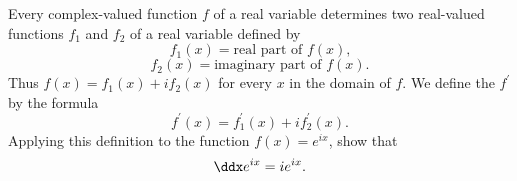 \begin{exercises}
Every complex-valued function $f$
of a real variable determines two real-valued
functions $f_1$ and $f_2$ of a real variable
defined by
\[
f_1(x) = \mbox{real part of $f(x)$,}
\]
\[
f_2(x) = \mbox{imaginary part of $f(x)$.}
\]
Thus $f(x) = f_1(x) + if_2(x)$ for every $x$ in
the domain of $f$.
We define the  $f^\prime$
by the formula
\[
f^\prime(x) = f_1^\prime(x) + i f_2^\prime(x)
.
\]
Applying this definition to the function $f(x) = e^{ix}$,
show that
\[
\ddx e^{ix} = i e^{ix}
.
\]

\end{exercises}
